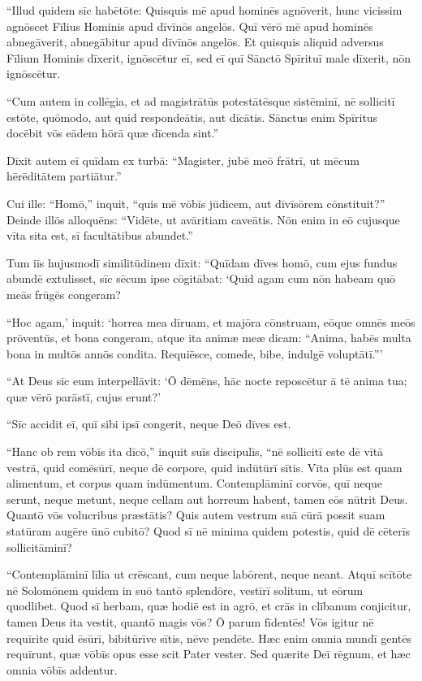 \Versus ``Illud quidem sīc habētōte: Quisquis mē apud hominēs agnōverit, hunc vicissim agnōscet Fīlius Hominis apud dīvīnōs angelōs.
\Versus Quī vērō mē apud hominēs abnegāverit, abnegābitur apud dīvīnōs angelōs.
\Versus Et quisquis aliquid adversus Fīlium Hominis dīxerit, ignōscētur eī, sed eī quī Sānctō Spīrituī male dīxerit, nōn ignōscētur.

\Versus ``Cum autem in collēgia, et ad magistrātūs potestātēsque sistēminī, nē sollicitī estōte, quōmodo, aut quid respondeātis, aut dīcātis.
\Versus Sānctus enim Spīritus docēbit vōs eādem hōrā quæ dīcenda sint.''

\Versus Dīxit autem eī quīdam ex turbā: ``Magister, jubē meō frātrī, ut mēcum hērēditātem partiātur.''

\Versus Cui ille: ``Homō,'' inquit, ``quis mē vōbīs jūdicem, aut dīvīsōrem cōnstituit?''
\Versus Deinde illōs alloquēns: ``Vidēte, ut avāritiam caveātis. Nōn enim in eō cujusque vīta sita est, sī facultātibus abundet.''

\Versus Tum iīs hujusmodī similitūdinem dīxit: ``Quīdam dīves homō, cum ejus fundus abundē extulisset,
\Versus sīc sēcum ipse cōgitābat: `Quid agam cum nōn habeam quō meās frūgēs congeram?

\Versus ``Hoc agam,' inquit: `horrea mea dīruam, et majōra cōnstruam, eōque omnēs meōs prōventūs, et bona congeram,
\Versus atque ita animæ meæ dicam: ``Anima, habēs multa bona in multōs annōs condita. Requiēsce, comede, bibe, indulgē voluptātī.''{}'

\Versus ``At Deus sīc eum interpellāvit: `Ō dēmēns, hāc nocte reposcētur ā tē anima tua; quæ vērō parāstī, cujus erunt?'

\Versus ``Sīc accidit eī, quī sibi ipsī congerit, neque Deō dīves est.

\Versus ``Hanc ob rem vōbīs ita dīcō,'' inquit suīs discipulīs, ``nē sollicitī este dē vītā vestrā, quid comēsūrī, neque dē corpore, quid indūtūrī sītis.
\Versus Vīta plūs est quam alimentum, et corpus quam indūmentum.
\Versus Contemplāminī corvōs, quī neque serunt, neque metunt, neque cellam aut horreum habent, tamen eōs nūtrit Deus. Quantō vōs volucribus præstātis?
\Versus Quis autem vestrum suā cūrā possit suam statūram augēre ūnō cubitō?
\Versus Quod sī nē minima quidem potestis, quid dē cēterīs sollicitāminī?

\Versus ``Contemplāminī līlia ut crēscant, cum neque labōrent, neque neant. Atquī scītōte nē Solomōnem quidem in suō tantō splendōre, vestīrī solitum, ut eōrum quodlibet.
\Versus Quod sī herbam, quæ hodiē est in agrō, et crās in clībanum conjicitur, tamen Deus ita vestit, quantō magis vōs? Ō parum fīdentēs!
\Versus Vōs igitur nē requīrite quid ēsūrī, bibitūrīve sītis, nēve pendēte.
\Versus Hæc enim omnia mundī gentēs requīrunt, quæ vōbīs opus esse scit Pater vester.
\Versus Sed quærite Deī rēgnum, et hæc omnia vōbīs addentur.

